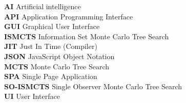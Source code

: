 
\textbf{AI} Artificial intelligence \\
\textbf{API} Application Programming Interface \\
\textbf{GUI} Graphical User Interface \\
\textbf{ISMCTS} Information Set Monte Carlo Tree Search \\
\textbf{JIT} Just In Time (Compiler) \\
\textbf{JSON} JavaScript Object Notation \\
\textbf{MCTS} Monte Carlo Tree Search \\
\textbf{SPA} Single Page Application \\
\textbf{SO-ISMCTS} Single Observer Monte Carlo Tree Search\\
\textbf{UI} User Interface
